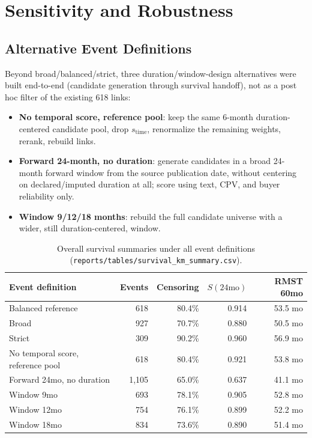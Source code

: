 \documentclass[11pt]{article}
\begin{document}
\section{Sensitivity and Robustness}
\label{sec:sensitivity}

\subsection{Alternative Event Definitions}
Beyond broad/balanced/strict, three duration/window-design alternatives
were built end-to-end (candidate generation through survival handoff), not
as a post hoc filter of the existing 618 links:
\begin{itemize}
  \item \textbf{No temporal score, reference pool}: keep the same
  6-month duration-centered candidate pool, drop $s_{\text{time}}$,
  renormalize the remaining weights, rerank, rebuild links.
  \item \textbf{Forward 24-month, no duration}: generate candidates in a
  broad 24-month forward window from the source publication date, without
  centering on declared/imputed duration at all; score using text, CPV,
  and buyer reliability only.
  \item \textbf{Window 9/12/18 months}: rebuild the full candidate universe
  with a wider, still duration-centered, window.
\end{itemize}

\begin{table}[h!]
\centering
\caption{Overall survival summaries under all event definitions
(\texttt{reports/tables/survival\_km\_summary.csv}).}
\label{tab:allvariants}
\begin{tabular}{lrrrr}
\toprule
Event definition & Events & Censoring & $S(24\text{mo})$ & RMST 60mo \\
\midrule
Balanced reference & 618 & 80.4\% & 0.914 & 53.5 mo \\
Broad & 927 & 70.7\% & 0.880 & 50.5 mo \\
Strict & 309 & 90.2\% & 0.960 & 56.9 mo \\
No temporal score, reference pool & 618 & 80.4\% & 0.921 & 53.8 mo \\
Forward 24mo, no duration & 1{,}105 & 65.0\% & 0.637 & 41.1 mo \\
Window 9mo & 693 & 78.1\% & 0.905 & 52.8 mo \\
Window 12mo & 754 & 76.1\% & 0.899 & 52.2 mo \\
Window 18mo & 834 & 73.6\% & 0.890 & 51.4 mo \\
\bottomrule
\end{tabular}
\end{table}
\end{document}
